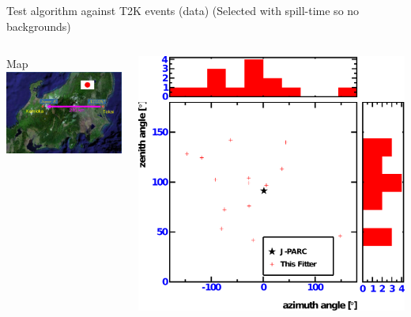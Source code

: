\documentclass[14pt]{beamer}
\begin{document}
\begin{frame}{Test algorithm against T2K events (data)}
	{\small(Selected with spill-time so no backgrounds)}
	\begin{columns}[t]
		\begin{block}{\centering\small{Map}}
			\vspace{10mm}
			\includegraphics[width=\linewidth]{t2k.jpeg}
		\end{block}
		\begin{block}{}
			\vspace{4mm}
			\includegraphics[width=\linewidth]{analyzed_rtq_t2k_nu_noNegativeCharge_prepulseCut_t2kReconDir.pdf}
		\end{block}
	\end{columns}
\end{frame}
\end{document}
